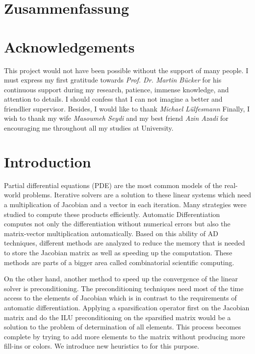 \documentclass[11pt, twoside,a4paper]{book}
\begin{document}
\chapter*{Zusammenfassung}
\chapter*{Acknowledgements}
\noindent This project would not have been possible without
the support of many people. I must express my first gratitude
towards \textit{Prof. Dr. Martin B\"ucker} for his continuous
support during my research, patience, immense knowledge,
and attention to details.
I should confess that I can not imagine a better and friendlier supervisor.
Besides, I would like to thank \textit{Michael Lülfesmann}
Finally, I wish to thank my wife \textit{Masoumeh Seydi} and
my best friend \textit{Azin Azadi} for encouraging me throughout all my studies at University.

\tableofcontents
\chapter{Introduction}
Partial differential equations (PDE) are the most common models of the real-world problems. Iterative solvers are a solution to these linear systems which need a multiplication of Jacobian and a vector in each iteration.
Many strategies were studied to compute these products efficiently.
Automatic Differentiation~\cite{Griewank2008EDP,Rall1981ADT} computes not only the differentiation without numerical errors but also the matrix-vector multiplication automatically.
Based on this ability of AD techniques, different methods are analyzed to reduce the memory that is needed to store the Jacobian matrix as well as speeding up the computation. These methods are parts of a bigger area called combinatorial scientific computing.

On the other hand, another method to speed up the convergence of the linear solver
is preconditioning. The preconditioning techniques need most of the time access to
the elements of Jacobian which is in contrast to the requirements of automatic differentiation.
Applying a sparsification operator first on the Jacobian matrix and do the ILU preconditioning
on the sparsified matrix would be a solution to the problem of determination of
all elements. This process becomes complete by trying to add more elements to the matrix
without producing more fill-ins or colors. We introduce new heuristics to for this purpose.
\end{document}
